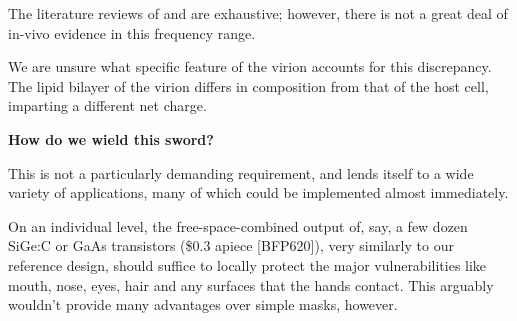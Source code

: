 \documentclass[fleqn,10pt]{paper}
\begin{document}
The literature reviews of \cite{ICNIRP2020} and \cite{C95} are exhaustive; however, there is not a great deal of in-vivo evidence in this frequency range\cite{New2019}\cite{Comprehensive2018}.

We are unsure what specific feature of the virion accounts for this discrepancy. The lipid bilayer of the virion differs in composition from that of the host cell, imparting a different net charge.

\clearpage 
{\Large \textbf{How do we wield this sword?}}

This is not a particularly demanding requirement, and lends itself to a wide variety of applications, many of which could be implemented almost immediately. 

On an individual level, the free-space-combined output of, say, a few dozen SiGe:C or GaAs transistors (\$0.3 apiece [BFP620]), very similarly to our reference design, should suffice to locally protect the major vulnerabilities like mouth, nose, eyes, hair and any surfaces that the hands contact. This arguably wouldn't provide many advantages over simple masks, however. 



\clearpage




\printbibliography[heading=none, title={}]
\end{document}
